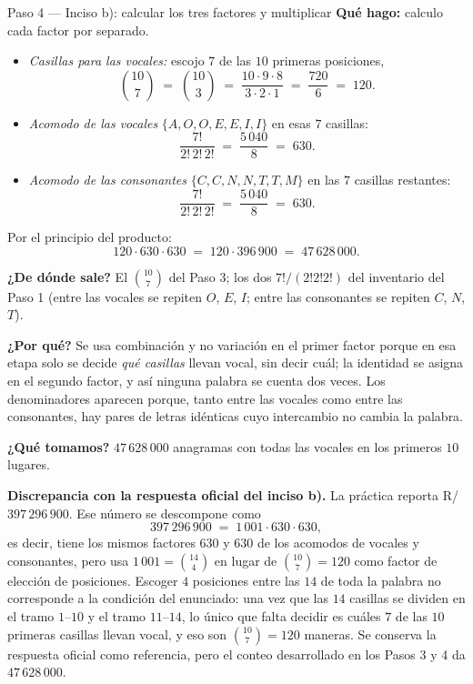 \documentclass[11pt]{article}
\begin{document}
\begin{paso}{Paso 4 --- Inciso b): calcular los tres factores y multiplicar}
\textbf{Qué hago:} calculo cada factor por separado.
\begin{itemize}[leftmargin=1.4em]
\item \emph{Casillas para las vocales:} escojo $7$ de las $10$ primeras posiciones,
\[
\binom{10}{7} \;=\; \binom{10}{3} \;=\; \frac{10\cdot 9\cdot 8}{3\cdot 2\cdot 1} \;=\; \frac{720}{6} \;=\; 120 .
\]
\item \emph{Acomodo de las vocales} $\{A,O,O,E,E,I,I\}$ en esas $7$ casillas:
\[
\frac{7!}{2!\,2!\,2!} \;=\; \frac{5\,040}{8} \;=\; 630 .
\]
\item \emph{Acomodo de las consonantes} $\{C,C,N,N,T,T,M\}$ en las $7$ casillas restantes:
\[
\frac{7!}{2!\,2!\,2!} \;=\; \frac{5\,040}{8} \;=\; 630 .
\]
\end{itemize}
Por el principio del producto:
\[
120\cdot 630\cdot 630 \;=\; 120\cdot 396\,900 \;=\; 47\,628\,000 .
\]

\textbf{¿De dónde sale?} El $\binom{10}{7}$ del Paso 3; los dos $7!/(2!2!2!)$ del inventario del Paso 1
(entre las vocales se repiten $O$, $E$, $I$; entre las consonantes se repiten $C$, $N$, $T$).

\textbf{¿Por qué?} Se usa combinación y no variación en el primer factor porque en esa etapa solo se decide
\emph{qué casillas} llevan vocal, sin decir cuál; la identidad se asigna en el segundo factor, y así ninguna
palabra se cuenta dos veces. Los denominadores aparecen porque, tanto entre las vocales como entre las
consonantes, hay pares de letras idénticas cuyo intercambio no cambia la palabra.

\textbf{¿Qué tomamos?} $47\,628\,000$ anagramas con todas las vocales en los primeros $10$ lugares.
\end{paso}

\begin{nota}
\textbf{Discrepancia con la respuesta oficial del inciso b).} La práctica reporta R/ $397\,296\,900$. Ese
número se descompone como
\[
397\,296\,900 \;=\; 1\,001\cdot 630\cdot 630 ,
\]
es decir, tiene los mismos factores $630$ y $630$ de los acomodos de vocales y consonantes, pero usa
$1\,001=\binom{14}{4}$ en lugar de $\binom{10}{7}=120$ como factor de elección de posiciones. Escoger $4$
posiciones entre las $14$ de toda la palabra no corresponde a la condición del enunciado: una vez que las
$14$ casillas se dividen en el tramo $1$--$10$ y el tramo $11$--$14$, lo único que falta decidir es cuáles
$7$ de las $10$ primeras casillas llevan vocal, y eso son $\binom{10}{7}=120$ maneras. Se conserva la
respuesta oficial como referencia, pero el conteo desarrollado en los Pasos 3 y 4 da $47\,628\,000$.
\end{nota}
\end{document}
